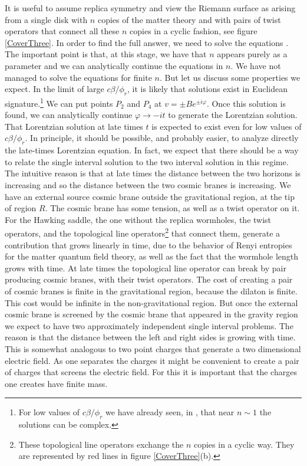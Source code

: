 It is useful to assume replica symmetry and view the Riemann surface as arising from a single disk with 
$n$ copies of the matter theory and with pairs of twist operators that connect all these $n$ copies in a cyclic fashion, see figure \ref{CoverThree}. In order to find the full answer, we need to solve the equations  . The important point is that, at this stage, we have that $n$ appears purely as a parameter and we can analytically continue the equations in $n$. 
  We have not managed to solve the equations for finite $n$. 
But let us discuss some properties we expect. 
In the limit of large $c \beta/\phi_r$, it is likely that solutions exist in Euclidean signature.\footnote{For low values of $c\beta/\phi_r$ we have already seen, in , that near $n\sim 1$ the solutions can be complex.} 
We can put points 
$P_2$ and $P_4$ at  $v=\pm B e^{ \pm i \varphi }$.   Once this solution is found, we can analytically continue $\varphi \to - i t$ to generate the Lorentzian solution. 
That Lorentzian solution at late times $t$ is expected to exist even for low values of $c \beta/\phi_r$.
In principle, it should be possible, and probably easier,  to analyze directly the late-times Lorentzian equation. 
In fact, 
 we expect that there should be a way to relate the single interval solution to the two interval solution in this regime. The intuitive reason is that at late times the distance between the two horizons is increasing and so the distance between the two cosmic branes is increasing.  We have an external source cosmic brane outside the gravitational region, at the tip of region $R$. 
 The cosmic brane has some tension, as well as a twist operator on it. For the Hawking saddle, the one without the replica wormholes, the twist operators, and the topological line operators\footnote{These topological line operators exchange the $n$ copies in a cyclic way. They are represented by red lines in figure \ref{CoverThree}(b).} that connect them, generate a contribution that grows linearly in time, due to the behavior of 
 Renyi entropies for the matter quantum field theory, as well as the fact that the wormhole length grows with time. 
   At late times the topological line operator can break by pair producing cosmic branes, with their twist operators. The cost of creating a pair of cosmic branes is finite in the gravitational region, because the dilaton is finite. This cost would be infinite in the non-gravitational region. 
  But once the external cosmic brane is screened by the cosmic brane that appeared in the gravity region we expect to have two approximately  independent single interval problems. The reason is that the distance between the left and right sides is growing with time.
  This is somewhat analogous to two point charges that generate a two dimensional electric field. As one separates the charges it might be convenient to create a pair of charges that screens the electric field. For this it is important that the charges one creates have finite mass.
 
